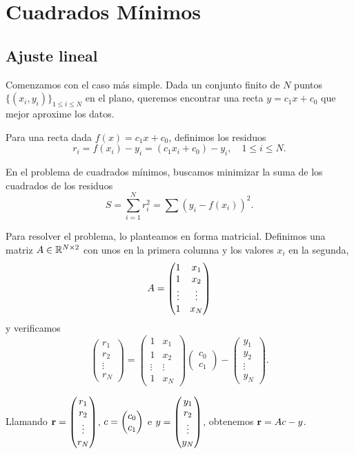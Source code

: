 \chapter{Cuadrados Mínimos}

\section{Ajuste lineal}
Comenzamos con el caso más simple. Dada un conjunto finito de $N$ puntos $\{(x_i, y_i)\}_{1 \le i \le N}$ en el plano, queremos encontrar una recta $y = c_1 x + c_0$ que mejor aproxime los datos.

Para una recta dada $f(x) = c_1 x + c_0$, definimos los residuos
$$
r_i = f(x_i) - y_i = (c_1 x_i + c_0) - y_i, \quad 1 \le i \le N.
$$

En el problema de cuadrados mínimos, buscamos minimizar la suma de los cuadrados de los residuos
$$
S = \sum_{i = 1}^N r_i^2 = \sum (y_i - f(x_i))^2.
$$

Para resolver el problema, lo planteamos en forma matricial. Definimos una matriz $\Ab \in \R^{N \times 2}$ con unos en la primera columna y los valores $x_i$ en la segunda,
$$
\Ab = \begin{pmatrix}
1 & x_1 \\
1 & x_2 \\
\vdots & \vdots \\
1 & x_N
\end{pmatrix}
$$
y verificamos
$$
\begin{pmatrix}
r_1 \\
r_2 \\
\vdots \\
r_N
\end{pmatrix} =
\begin{pmatrix}
1 & x_1 \\
1 & x_2 \\
\vdots & \vdots \\
1 & x_N
\end{pmatrix}
\begin{pmatrix}
c_0 \\
c_1
\end{pmatrix}
- \begin{pmatrix}
y_1 \\
y_2 \\
\vdots \\
y_N
\end{pmatrix}.
$$

Llamando $\mathbf{r} = \begin{pmatrix}
r_1 \\
r_2 \\
\vdots \\
r_N
\end{pmatrix}$,
$\cb = \begin{pmatrix}
c_0 \\
c_1
\end{pmatrix}$ e  $\yb = \begin{pmatrix}
y_1 \\
r_2 \\
\vdots \\
y_N
\end{pmatrix}$, obtenemos $\rb = \Ab \cb - \yb$.

